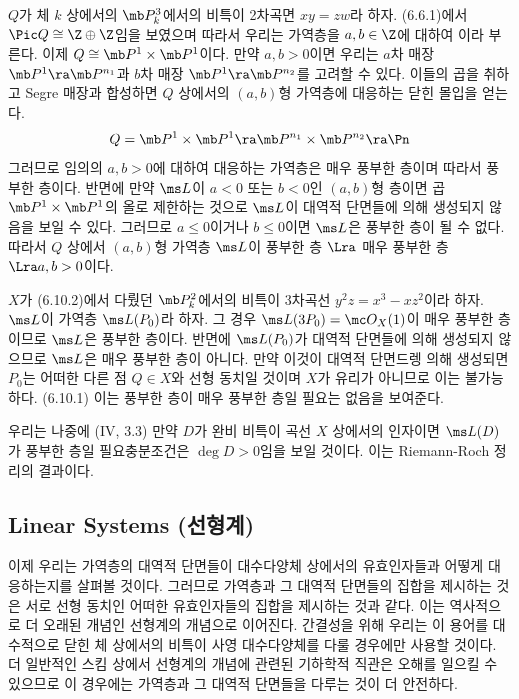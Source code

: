 	
	\begin{example}
	$Q$가 체 $k$ 상에서의 $\mb P^3_k$에서의 비특이 2차곡면 $xy=zw$라 하자.
	(6.6.1)에서 $\Pic Q\cong\Z\oplus\Z$임을 보였으며 따라서 우리는 가역층을 $a,b\in\Z$에 대하여
	이라 부른다. 이제 $Q\cong\mb P^1\times\mb P^1$이다.
	만약 $a,b>0$이면 우리는 $a$차 매장 $\mb P^1\ra\mb P^{n_1}$과 $b$차 매장 $\mb P^1\ra\mb P^{n_2}$를 고려할 수 있다.
	이들의 곱을 취하고 Segre 매장과 합성하면 $Q$ 상에서의 $(a,b)$형 가역층에 대응하는 닫힌 몰입을 얻는다.
	$$Q=\mb P^1\times\mb P^1\ra\mb P^{n_1}\times\mb P^{n_2}\ra\Pn$$
	그러므로 임의의 $a,b>0$에 대하여 대응하는 가역층은 매우 풍부한 층이며 따라서 풍부한 층이다.
	반면에 만약 $\ms L$이 $a<0$ 또는 $b<0$인 $(a,b)$형 층이면 곱 $\mb P^1\times\mb P^1$의 올로 제한하는 것으로
	$\ms L$이 대역적 단면들에 의해 생성되지 않음을 보일 수 있다.
	그러므로 $a\le 0$이거나 $b\le 0$이면 $\ms L$은 풍부한 층이 될 수 없다.
	따라서 $Q$ 상에서 $(a,b)$형 가역층 $\ms L$이 풍부한 층 $\Lra$ 매우 풍부한 층 $\Lra a,b>0$이다.
	\end{example}
	
	
	\begin{example}
	$X$가 (6.10.2)에서 다뤘던 $\mb P^2_k$에서의 비특이 3차곡선 $y^2z=x^3-xz^2$이라 하자.
	$\ms L$이 가역층 $\ms L(P_0)$라 하자. 그 경우 $\ms L(3P_0)=\mc O_X(1)$이 매우 풍부한 층이므로 $\ms L$은 풍부한 층이다.
	반면에 $\ms L(P_0)$가 대역적 단면들에 의해 생성되지 않으므로 $\ms L$은 매우 풍부한 층이 아니다.
	만약 이것이 대역적 단면드렝 의해 생성되면 $P_0$는 어떠한 다른 점 $Q\in X$와 선형 동치일 것이며
	$X$가 유리가 아니므로 이는 불가능하다. (6.10.1) 이는 풍부한 층이 매우 풍부한 층일 필요는 없음을 보여준다.
	\end{example}
	
	
	\begin{example}
	우리는 나중에 (IV, 3.3) 만약 $D$가 완비 비특이 곡선 $X$ 상에서의 인자이면 $\ms L(D)$가 풍부한 층일 필요충분조건은
	$\deg D>0$임을 보일 것이다. 이는 Riemann-Roch 정리의 결과이다.
	\end{example}
	
	
	\subsection*{Linear Systems (선형계)}
	
	이제 우리는 가역층의 대역적 단면들이 대수다양체 상에서의 유효인자들과 어떻게 대응하는지를 살펴볼 것이다.
	그러므로 가역층과 그 대역적 단면들의 집합을 제시하는 것은 서로 선형 동치인 어떠한 유효인자들의 집합을 제시하는 것과 같다.
	이는 역사적으로 더 오래된 개념인 선형계의 개념으로 이어진다.
	간결성을 위해 우리는 이 용어를 대수적으로 닫힌 체 상에서의 비특이 사영 대수다양체를 다룰 경우에만 사용할 것이다.
	더 일반적인 스킴 상에서 선형계의 개념에 관련된 기하학적 직관은 오해를 일으킬 수 있으므로
	이 경우에는 가역층과 그 대역적 단면들을 다루는 것이 더 안전하다.
	
